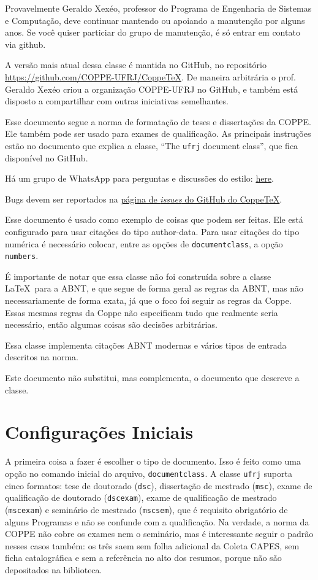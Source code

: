 \documentclass[dsc,setavermelha]{ufrj}
\theoremstyle{plain}
\theoremstyle{definition}
\theoremstyle{remark}
\begin{document}
   Provavelmente Geraldo Xexéo, professor do Programa de Engenharia de Sistemas e Computação, deve continuar mantendo ou apoiando a manutenção por alguns anos. Se você quiser particiar do grupo de manutenção, é só entrar em contato via github.

  A versão mais atual dessa classe é mantida no GitHub, no repositório \url{https://github.com/COPPE-UFRJ/CoppeTeX}. De maneira arbitrária o prof. Geraldo Xexéo criou a organização COPPE-UFRJ no GitHub, e também está disposto a compartilhar com outras iniciativas semelhantes.

  Esse documento segue a norma de formatação de teses e dissertações da COPPE. Ele também pode ser usado para exames de qualificação. As principais instruções estão no documento que explica a classe, ``The \verb|ufrj| document class'', que fica disponível no GitHub.

  Há um grupo de WhatsApp para perguntas e discussões do estilo: \href{https://github.com/COPPE-UFRJ/CoppeTeX/wiki}{here}.

  Bugs devem ser reportados na \href{https://github.com/COPPE-UFRJ/CoppeTeX/issues}{página de \textit{issues} do GitHub do CoppeTeX}.

  Esse documento é usado como exemplo de coisas que podem ser feitas. Ele está configurado para usar citações do tipo author-data. Para usar citações do tipo numérica é necessário colocar, entre as opções de \verb|documentclass|, a opção \verb|numbers|.

  É importante de notar que essa classe não foi construída sobre a classe \LaTeX \  para a ABNT, e que segue de forma geral as regras da ABNT, mas não necessariamente de forma exata, já que o foco foi seguir as regras da Coppe. Essas mesmas regras da Coppe não especificam tudo que realmente seria necessário, então algumas coisas são decisões arbitrárias.

  Essa classe implementa citações ABNT modernas e vários tipos de entrada descritos na norma.

  Este documento não substitui, mas complementa, o documento que descreve a classe.

\chapter{Configurações Iniciais}

   A primeira coisa a fazer é escolher o tipo de documento. Isso é feito como uma opção no comando inicial do arquivo, \verb|documentclass|. A classe \verb|ufrj| suporta cinco formatos: tese de doutorado (\verb|dsc|), dissertação de mestrado (\verb|msc|), exame de qualificação de doutorado (\verb|dscexam|), exame de qualificação de mestrado (\verb|mscexam|) e seminário de mestrado (\verb|mscsem|), que é requisito obrigatório de alguns Programas e não se confunde com a qualificação. Na verdade, a norma da COPPE não cobre os exames nem o seminário, mas é interessante seguir o padrão nesses casos também: os três saem sem folha adicional da Coleta CAPES, sem ficha catalográfica e sem a referência no alto dos resumos, porque não são depositados na biblioteca.
\end{document}

